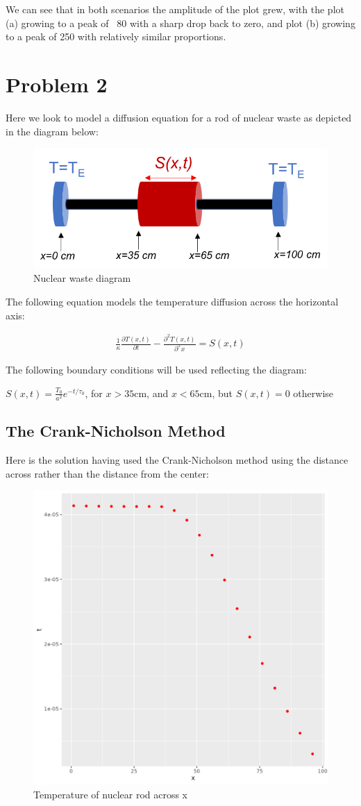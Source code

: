 \documentclass[prb,twocolumn]{revtex4-2}
\begin{document}
We can see that in both scenarios the amplitude of the plot grew, with the plot
(a) growing to a peak of ~80 with a sharp drop back to zero, and plot (b)
growing to a peak of 250 with relatively similar proportions.

\section{Problem 2}

Here we look to model a diffusion equation for a rod of nuclear waste as
depicted in the diagram below:

\begin{figure}[H]
    \centerline{\includegraphics [width=3 in] {p2/plot_rod.png}}
    \caption{Nuclear waste diagram} \label{q1}
\end{figure}

The following equation models the temperature diffusion across the horizontal
axis:

\begin{eqnarray}
    \frac{1}{\kappa}
    \frac{\partial T(x,t)}{\partial t} -
    \frac{\partial^2 T(x,t)}{\partial^x x} =
    S(x,t)
\end{eqnarray}

The following boundary conditions will be used reflecting the diagram:

$S(x,t) = \frac{T_0}{a^2}e^{-t/\tau_0}$,
for $x > 35$cm, and $x < 65$cm, but $S(x,t)=0$ otherwise

\subsection{The Crank-Nicholson Method}

Here is the solution having used the Crank-Nicholson method using the distance
across rather than the distance from the center:

\begin{figure}[H]
    \centerline{\includegraphics [width=3 in] {p2/crank}}
    \caption{Temperature of nuclear rod across x} \label{q1}
\end{figure}
\end{document}
